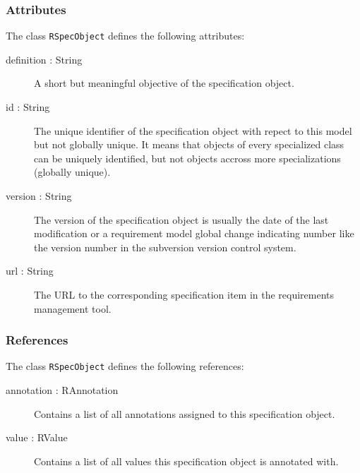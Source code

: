 \subsubsection{Attributes}
The class \verb|RSpecObject| defines the following attributes:
\begin{description}
	\item[definition : String] A short but meaningful objective of the specification object.
	\item[id : String] The unique identifier of the specification object with repect to this model but not globally unique.
It means that objects of every specialized class can be uniquely identified, but not objects accross more specializations (globally unique).
	\item[version : String] The version of the specification object is usually the date of the last modification or a requirement model global change indicating number like the version number in the subversion version control system.
	\item[url : String] The URL to the corresponding specification item in the requirements management tool.
\end{description}

\subsubsection{References}
The class \verb|RSpecObject| defines the following references:
\begin{description}
	\item[annotation : RAnnotation] Contains a list of all annotations assigned to this specification object.
	\item[value : RValue] Contains a list of all values this specification object is annotated with.
\end{description}

	